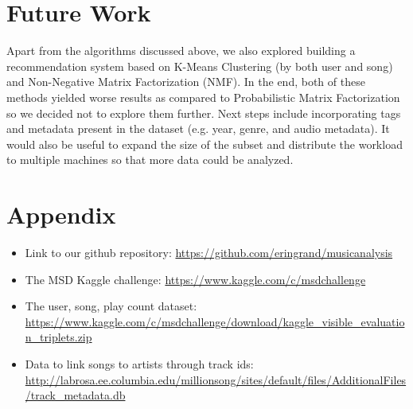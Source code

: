 \documentclass[11pt,preprint]{aastex}
\begin{document}
\section{Future Work}
Apart from the algorithms discussed above, we also explored building a recommendation system based on K-Means Clustering (by both user and song) and Non-Negative Matrix Factorization (NMF). In the end, both of these methods yielded worse results as compared to Probabilistic Matrix Factorization so we decided not to explore them further. Next steps include incorporating tags and metadata present in the dataset (e.g. year, genre, and audio metadata). It would also be useful to expand the size of the subset and distribute the workload to multiple machines so that more data could be analyzed.




\newpage


\small{
\section{Appendix}

\begin{itemize}

  \item Link to our github repository: \url{https://github.com/eringrand/musicanalysis}
  \item The MSD Kaggle challenge: \url{https://www.kaggle.com/c/msdchallenge}
  \item The user, song, play count dataset: \url{https://www.kaggle.com/c/msdchallenge/download/kaggle_visible_evaluation_triplets.zip}
  \item Data to link songs to artists through track ids: \url{http://labrosa.ee.columbia.edu/millionsong/sites/default/files/AdditionalFiles/track_metadata.db}

\end{itemize}
}
\end{document}
